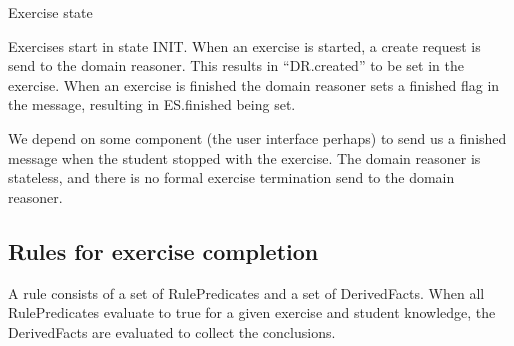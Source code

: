 \begin{Figure}
\caption{Exercise state}\label{fig:ltstate}
\end{Figure}

Exercises start in state INIT. When an exercise is started, a create request is send to the domain reasoner.
This results in ``DR.created'' to be set in the exercise.
When an exercise is finished the domain reasoner sets a finished flag in the message, resulting in ES.finished being set.


We depend on some component (the user interface perhaps) to send us a finished message when the student stopped with the exercise.
The domain reasoner is stateless, and there is no formal exercise termination send to the domain reasoner.



\subsection{Rules for exercise completion}
\label{subs:rules}

A rule consists of a set of RulePredicates and a set of DerivedFacts.
When all RulePredicates evaluate to true for a given exercise and student knowledge, the DerivedFacts are evaluated to collect the conclusions. 

